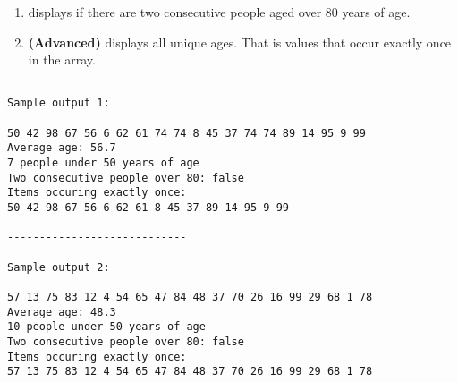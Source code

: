 \begin{questions}
\begin{enumerate}
\item displays if there are two consecutive people aged over 80 years of age.

\item \textbf{(Advanced)} displays all unique ages. That is values that occur exactly once in the array.
\end{enumerate}

\begin{verbatim}

Sample output 1:

50 42 98 67 56 6 62 61 74 74 8 45 37 74 74 89 14 95 9 99 
Average age: 56.7
7 people under 50 years of age
Two consecutive people over 80: false
Items occuring exactly once: 
50 42 98 67 56 6 62 61 8 45 37 89 14 95 9 99 

----------------------------

Sample output 2:

57 13 75 83 12 4 54 65 47 84 48 37 70 26 16 99 29 68 1 78 
Average age: 48.3
10 people under 50 years of age
Two consecutive people over 80: false
Items occuring exactly once: 
57 13 75 83 12 4 54 65 47 84 48 37 70 26 16 99 29 68 1 78 

\end{verbatim}

\end{questions}



